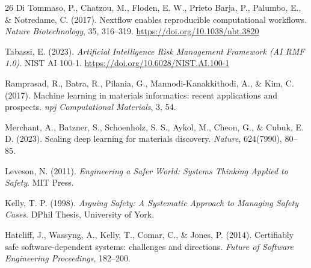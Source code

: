 \documentclass[11pt,a4paper,oneside]{report}
\begin{document}
\begin{thebibliography}{26}
Di Tommaso, P., Chatzou, M., Floden, E. W., Prieto Barja, P., Palumbo, E., \& Notredame, C. (2017). Nextflow enables reproducible computational workflows. \emph{Nature Biotechnology}, 35, 316--319. \url{https://doi.org/10.1038/nbt.3820}

Tabassi, E. (2023). \emph{Artificial Intelligence Risk Management Framework (AI RMF 1.0)}. NIST AI 100-1. \url{https://doi.org/10.6028/NIST.AI.100-1}

Ramprasad, R., Batra, R., Pilania, G., Mannodi-Kanakkithodi, A., \& Kim, C. (2017). Machine learning in materials informatics: recent applications and prospects. \emph{npj Computational Materials}, 3, 54.

Merchant, A., Batzner, S., Schoenholz, S. S., Aykol, M., Cheon, G., \& Cubuk, E. D. (2023). Scaling deep learning for materials discovery. \emph{Nature}, 624(7990), 80--85.

Leveson, N. (2011). \emph{Engineering a Safer World: Systems Thinking Applied to Safety}. MIT Press.

Kelly, T. P. (1998). \emph{Arguing Safety: A Systematic Approach to Managing Safety Cases}. DPhil Thesis, University of York.

Hatcliff, J., Wassyng, A., Kelly, T., Comar, C., \& Jones, P. (2014). Certifiably safe software-dependent systems: challenges and directions. \emph{Future of Software Engineering Proceedings}, 182--200.

\end{thebibliography}
\end{document}
